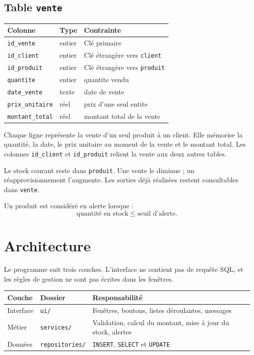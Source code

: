 \documentclass[11pt,a4paper]{article}
\begin{document}
\subsection{Table \texttt{vente}}

\begin{center}
\begin{tabular}{@{}lll@{}}
\toprule
\textbf{Colonne} & \textbf{Type} & \textbf{Contrainte} \\
\midrule
\texttt{id\_vente} & entier & Clé primaire \\
\texttt{id\_client} & entier & Clé étrangère vers \texttt{client} \\
\texttt{id\_produit} & entier & Clé étrangère vers \texttt{produit} \\
\texttt{quantite} & entier & quantite vendu \\
\texttt{date\_vente} & texte & date de vente \\
\texttt{prix\_unitaire} & réel & prix d'une seul entite \\
\texttt{montant\_total} & réel & montant total de la vente \\
\bottomrule
\end{tabular}
\end{center}


Chaque ligne représente la vente d'un seul produit à un client. Elle mémorise la quantité, la date, le prix unitaire au moment de la vente et le montant total. Les colonnes \texttt{id\_client} et \texttt{id\_produit} relient la vente aux deux autres tables.

Le stock courant reste dans \texttt{produit}. Une vente le diminue ; un réapprovisionnement l'augmente. Les sorties déjà réalisées restent consultables dans \texttt{vente}.

Un produit est considéré en alerte lorsque :
\[
\text{quantité en stock} \le \text{seuil d'alerte}.
\]

\section{Architecture}

Le programme suit trois couches. L'interface ne contient pas de requête SQL, et les règles de gestion ne sont pas écrites dans les fenêtres.

\begin{center}
\begin{tabularx}{\textwidth}{@{}l l X@{}}
\toprule
\textbf{Couche} & \textbf{Dossier} & \textbf{Responsabilité} \\
\midrule
Interface & \texttt{ui/} & Fenêtres, boutons, listes déroulantes, messages \\
Métier & \texttt{services/} & Validation, calcul du montant, mise à jour du stock, alertes \\
Données & \texttt{repositories/} & \texttt{INSERT}, \texttt{SELECT} et \texttt{UPDATE} \\
\bottomrule
\end{tabularx}
\end{center}
\end{document}
